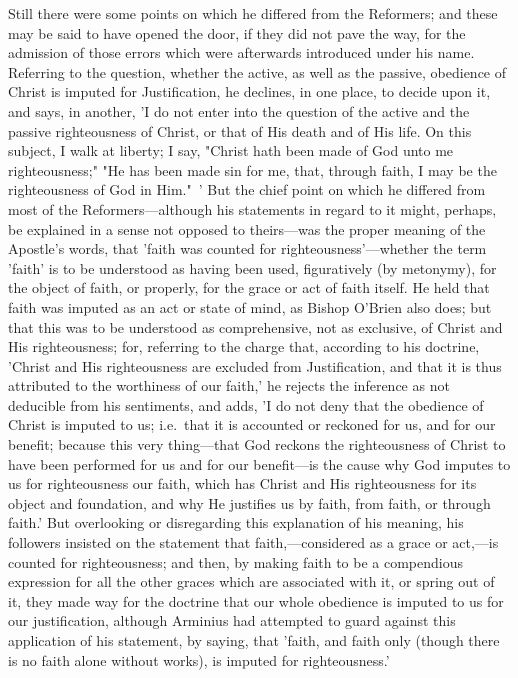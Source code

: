 \documentclass[
]{book}
\begin{document}
Still there were some points on which he differed from the Reformers; and these may be said to have opened the door, if they did not pave the way, for the admission of those errors which were afterwards introduced under his name. Referring to the question, whether the active, as well as the passive, obedience of Christ is imputed for Justification, he declines, in one place, to decide upon it, and says, in another, 'I do not enter into the question of the active and the passive righteousness of Christ, or that of His death and of His life. On this subject, I walk at liberty; I say, "Christ hath been made of God unto me righteousness;" "He has been made sin for me, that, through faith, I may be the righteousness of God in Him."~' But the chief point on which he differed from most of the Reformers---although his statements in regard to it might, perhaps, be explained in a sense not opposed to theirs---was the proper meaning of the Apostle's words, that 'faith was counted for righteousness'---whether the term 'faith' is to be understood as having been used, figuratively (by metonymy), for the object of faith, or properly, for the grace or act of faith itself. He held that faith was imputed as an act or state of mind, as Bishop O'Brien also does; but that this was to be understood as comprehensive, not as exclusive, of Christ and His righteousness; for, referring to the charge that, according to his doctrine, 'Christ and His righteousness are excluded from Justification, and that it is thus attributed to the worthiness of our faith,' he rejects the inference as not deducible from his sentiments, and adds, 'I do not deny that the obedience of Christ is imputed to us; i.e.~that it is accounted or reckoned for us, and for our benefit; because this very thing---that God reckons the righteousness of Christ to have been performed for us and for our benefit---is the cause why God imputes to us for righteousness our faith, which has Christ and His righteousness for its object and foundation, and why He justifies us by faith, from faith, or through faith.' But overlooking or disregarding this explanation of his meaning, his followers insisted on the statement that faith,---considered as a grace or act,---is counted for righteousness; and then, by making faith to be a compendious expression for all the other graces which are associated with it, or spring out of it, they made way for the doctrine that our whole obedience is imputed to us for our justification, although Arminius had attempted to guard against this application of his statement, by saying, that 'faith, and faith only (though there is no faith alone without works), is imputed for righteousness.'
\end{document}
